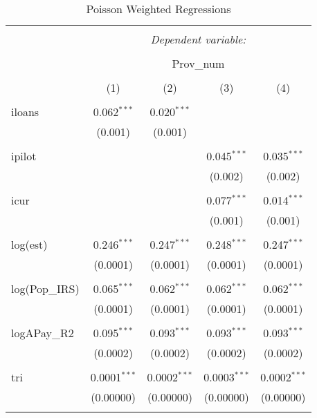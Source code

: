 
\begin{table}[!htbp] \centering 
  \caption{Poisson Weighted Regressions} 
  \label{} 
\begin{tabular}{@{\extracolsep{5pt}}lcccc} 
\\[-1.8ex]\hline 
\hline \\[-1.8ex] 
 & \multicolumn{4}{c}{\textit{Dependent variable:}} \\ 
\cline{2-5} 
\\[-1.8ex] & \multicolumn{4}{c}{Prov\_num} \\ 
\\[-1.8ex] & (1) & (2) & (3) & (4)\\ 
\hline \\[-1.8ex] 
 iloans & 0.062$^{***}$ & 0.020$^{***}$ &  &  \\ 
  & (0.001) & (0.001) &  &  \\ 
  & & & & \\ 
 ipilot &  &  & 0.045$^{***}$ & 0.035$^{***}$ \\ 
  &  &  & (0.002) & (0.002) \\ 
  & & & & \\ 
 icur &  &  & 0.077$^{***}$ & 0.014$^{***}$ \\ 
  &  &  & (0.001) & (0.001) \\ 
  & & & & \\ 
 log(est) & 0.246$^{***}$ & 0.247$^{***}$ & 0.248$^{***}$ & 0.247$^{***}$ \\ 
  & (0.0001) & (0.0001) & (0.0001) & (0.0001) \\ 
  & & & & \\ 
 log(Pop\_IRS) & 0.065$^{***}$ & 0.062$^{***}$ & 0.062$^{***}$ & 0.062$^{***}$ \\ 
  & (0.0001) & (0.0001) & (0.0001) & (0.0001) \\ 
  & & & & \\ 
 logAPay\_R2 & 0.095$^{***}$ & 0.093$^{***}$ & 0.093$^{***}$ & 0.093$^{***}$ \\ 
  & (0.0002) & (0.0002) & (0.0002) & (0.0002) \\ 
  & & & & \\ 
 tri & 0.0001$^{***}$ & 0.0002$^{***}$ & 0.0003$^{***}$ & 0.0002$^{***}$ \\ 
  & (0.00000) & (0.00000) & (0.00000) & (0.00000) \\ 
  & & & & \\ 

\end{tabular}
\end{table}
